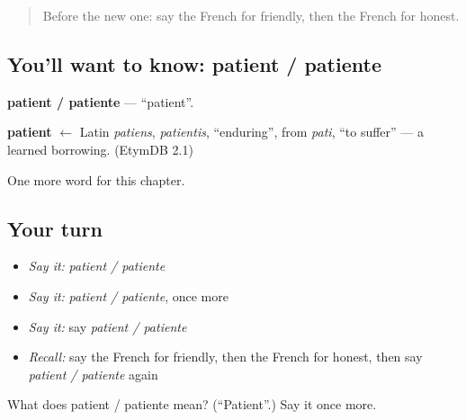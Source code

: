 \begin{quote}
Before the new one: say the French for friendly, then the French for honest.
\end{quote}

\subsection*{You'll want to know: patient / patiente}
\textbf{patient / patiente} — \textquotedblleft{}patient\textquotedblright{}.

\begin{cousinweb}
\textbf{patient} $\leftarrow$ Latin \emph{patiens}, \emph{patientis}, \textquotedblleft{}enduring\textquotedblright{}, from \emph{pati}, \textquotedblleft{}to suffer\textquotedblright{} — a learned borrowing. (EtymDB 2.1)
\end{cousinweb}

\begin{grammarlens}[title={What you've built}]
One more word for this chapter.
\end{grammarlens}

\subsection*{Your turn}
\begin{itemize}
\raggedright
  \item \emph{Say it:} \emph{patient / patiente}
  \item \emph{Say it:} \emph{patient / patiente}, once more
  \item \emph{Say it:} say \emph{patient / patiente}
  \item \emph{Recall:} say the French for friendly, then the French for honest, then say \emph{patient / patiente} again
\end{itemize}

\begin{tcolorbox}[breakable,colback=teal!4,colframe=teal!35!black,title={Before you move on}]
What does patient / patiente mean? (\textquotedblleft{}Patient\textquotedblright{}.) Say it once more.
\end{tcolorbox}
